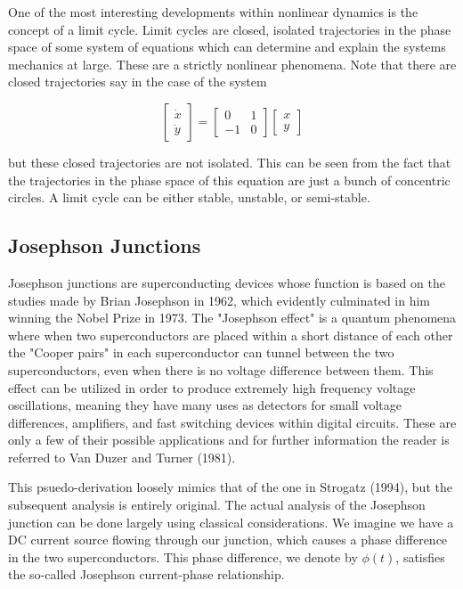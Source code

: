 \documentclass[12pt]{article}
\begin{document}
One of the most interesting developments within nonlinear dynamics is the concept of a limit cycle.  Limit cycles are closed, isolated trajectories in the phase space of some system of equations which can determine and explain the systems mechanics at large.  These are a strictly nonlinear phenomena.  Note that there are closed trajectories say in the case of the system

\begin{equation}
\begin{bmatrix}
\dot{x} \\ \dot{y}
\end{bmatrix} = 
\begin{bmatrix}
0 & 1 \\
-1 & 0
\end{bmatrix}
\begin{bmatrix}
x \\ y
\end{bmatrix}
\end{equation}

but these closed trajectories are not isolated.  This can be seen from the fact that the trajectories in the phase space of this equation are just a bunch of concentric circles.  A limit cycle can be either stable, unstable, or semi-stable.

\subsection{Josephson Junctions}

Josephson junctions are superconducting devices whose function is based on the studies made by Brian Josephson in 1962, which evidently culminated in him winning the Nobel Prize in 1973.  The "Josephson effect" is a quantum phenomena where when two superconductors are placed within a short distance of each other the "Cooper pairs" in each superconductor can tunnel between the two superconductors, even when there is no voltage difference between them.  This effect can be utilized in order to produce extremely high frequency voltage oscillations, meaning they have many uses as detectors for small voltage differences, amplifiers, and fast switching devices within digital circuits.  These are only a few of their possible applications and for further information the reader is referred to Van Duzer and Turner (1981).


This psuedo-derivation loosely mimics that of the one in Strogatz (1994), but the subsequent analysis is entirely original. The actual analysis of the Josephson junction can be done largely using classical considerations.  We imagine we have a DC current source flowing through our junction, which causes a phase difference in the two superconductors.  This phase difference, we denote by $\phi(t)$, satisfies the so-called Josephson current-phase relationship.
\end{document}
